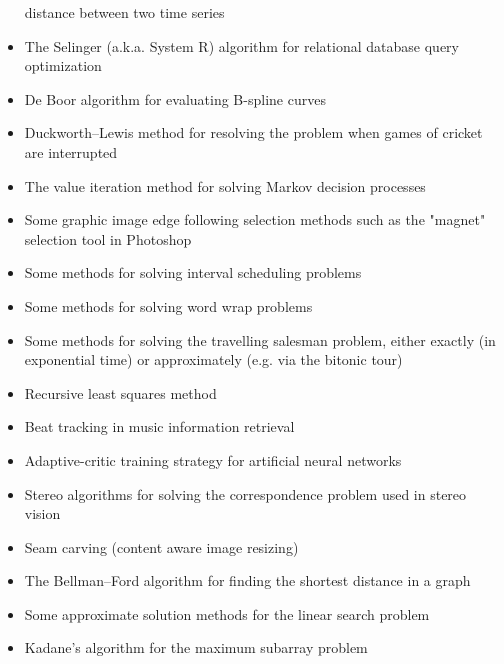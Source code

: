 \begin{slide}
\begin{PauseHighLight}
\begin{itemize}
    distance between two time series 
  \item The Selinger (a.k.a. System R) algorithm for relational database
    query optimization 
  \item De Boor algorithm for evaluating B-spline curves
  \item Duckworth–Lewis method for resolving the problem when games of
    cricket are interrupted 
  \item The value iteration method for solving Markov decision processes
  \item Some graphic image edge following selection methods such as the
    "magnet" selection tool in Photoshop 
  \item Some methods for solving interval scheduling problems
  \item Some methods for solving word wrap problems
  \item Some methods for solving the travelling salesman problem, either
    exactly (in exponential time) or approximately (e.g. via the bitonic
    tour) 
  \item Recursive least squares method
  \item Beat tracking in music information retrieval
  \item Adaptive-critic training strategy for artificial neural networks
  \item Stereo algorithms for solving the correspondence problem used in
    stereo vision 
  \item Seam carving (content aware image resizing)
  \item The Bellman–Ford algorithm for finding the shortest distance in
    a graph 
  \item Some approximate solution methods for the linear search problem
  \item Kadane's algorithm for the maximum subarray problem
  \end{itemize}
\end{PauseHighLight}

\end{slide}


\Outline %

